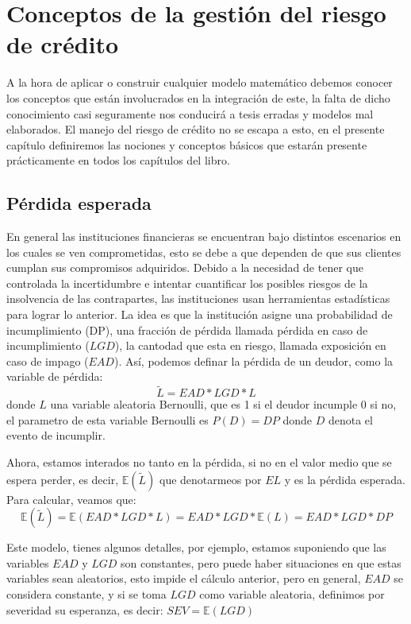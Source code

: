 \documentclass[
  12pt,
]{krantz}
\theoremstyle{definition}
\theoremstyle{definition}
\theoremstyle{definition}
\theoremstyle{remark}
\begin{document}
\mainmatter

\hypertarget{conceptos-de-la-gestion-del-riesgo-de-credito}{%
\chapter{Conceptos de la gestión del riesgo de crédito}\label{conceptos-de-la-gestion-del-riesgo-de-credito}}

A la hora de aplicar o construir cualquier modelo matemático debemos conocer los conceptos que están involucrados en la integración de este, la falta de dicho conocimiento casi seguramente nos conducirá a tesis erradas y modelos mal elaborados. El manejo del riesgo de crédito no se escapa a esto, en el presente capítulo definiremos las nociones y conceptos básicos que estarán presente prácticamente en todos los capítulos del libro.

\hypertarget{perdida-esperada}{%
\section{Pérdida esperada}\label{perdida-esperada}}

En general las instituciones financieras se encuentran bajo distintos escenarios en los cuales se ven comprometidas, esto se debe a que dependen de que sus clientes cumplan sus compromisos adquiridos. Debido a la necesidad de tener que controlada la incertidumbre e intentar cuantificar los posibles riesgos de la insolvencia de las contrapartes, las instituciones usan herramientas estadísticas para lograr lo anterior. La idea es que la institución asigne una probabilidad de incumplimiento (DP), una fracción de pérdida llamada pérdida en caso de incumplimiento (\(LGD\)), la cantodad que esta en riesgo, llamada exposición en caso de impago (\(EAD\)). Así, podemos definar la pérdida de un deudor, como la variable de pérdida:\[\tilde{L}=EAD*LGD*L\]
donde \(L\) una variable aleatoria Bernoulli, que es 1 si el deudor incumple 0 si no, el parametro de esta variable Bernoulli es \(P(D)=DP\) donde \(D\) denota el evento de incumplir.

Ahora, estamos interados no tanto en la pérdida, si no en el valor medio que se espera perder, es decir, \(\mathbb{E}(\tilde{L})\) que denotarmeos por \(EL\) y es la pérdida esperada. Para calcular, veamos que:\[\mathbb{E}(\tilde{L})=\mathbb{E}(EAD*LGD*L)=EAD*LGD*\mathbb{E}(L)=EAD*LGD*DP\]

Este modelo, tienes algunos detalles, por ejemplo, estamos suponiendo que las variables \(EAD\) y \(LGD\) son constantes, pero puede haber situaciones en que estas variables sean aleatorios, esto impide el cálculo anterior, pero en general, \(EAD\) se considera constante, y si se toma \(LGD\) como variable aleatoria, definimos por severidad su esperanza, es decir: \(SEV=\mathbb{E}(LGD)\)
\end{document}
